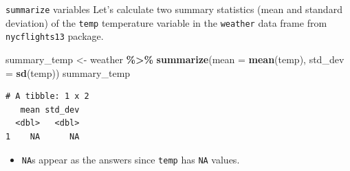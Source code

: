 \documentclass[
  ignorenonframetext,
]{beamer}
\newenvironment{Shaded}{\begin{snugshade}}{\end{snugshade}}
\newcommand{\AttributeTok}[1]{\textcolor[rgb]{0.13,0.29,0.53}{#1}}
\newcommand{\FunctionTok}[1]{\textcolor[rgb]{0.13,0.29,0.53}{\textbf{#1}}}
\newcommand{\NormalTok}[1]{#1}
\newcommand{\OtherTok}[1]{\textcolor[rgb]{0.56,0.35,0.01}{#1}}
\newcommand{\SpecialCharTok}[1]{\textcolor[rgb]{0.81,0.36,0.00}{\textbf{#1}}}
\providecommand{\tightlist}{%
  \setlength{\itemsep}{0pt}\setlength{\parskip}{0pt}}
\begin{document}
\begin{frame}[fragile]{\texttt{summarize} variables}
\protect\hypertarget{summarize-variables-1}{}
Let's calculate two summary statistics (mean and standard deviation) of
the \texttt{temp} temperature variable in the \texttt{weather} data
frame from \texttt{nycflights13} package.

\normalsize

\begin{Shaded}
\begin{Highlighting}[]
\NormalTok{summary\_temp }\OtherTok{\textless{}{-}}\NormalTok{ weather }\SpecialCharTok{\%\textgreater{}\%} 
  \FunctionTok{summarize}\NormalTok{(}\AttributeTok{mean =} \FunctionTok{mean}\NormalTok{(temp), }\AttributeTok{std\_dev =} \FunctionTok{sd}\NormalTok{(temp))}
\NormalTok{summary\_temp}
\end{Highlighting}
\end{Shaded}

\begin{verbatim}
# A tibble: 1 x 2
   mean std_dev
  <dbl>   <dbl>
1    NA      NA
\end{verbatim}

\normalsize

\begin{itemize}
\tightlist
\item
  \texttt{NA}s appear as the answers since \texttt{temp} has \texttt{NA}
  values.
\end{itemize}
\end{frame}
\end{document}
